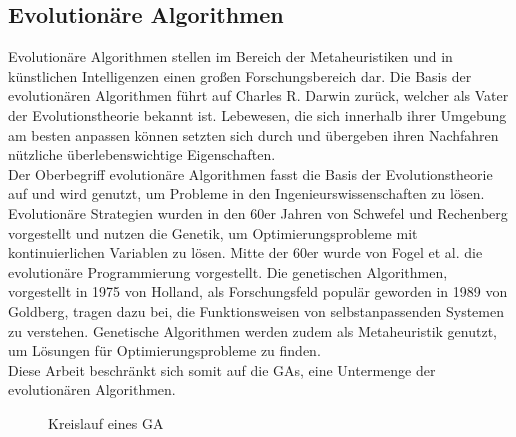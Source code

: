 \subsection{Evolutionäre Algorithmen} \label{subsec:Grundlagen_EvolutionäreAlgorithmen}

Evolutionäre Algorithmen stellen im Bereich der Metaheuristiken und in künstlichen Intelligenzen einen großen Forschungsbereich dar. Die Basis der evolutionären Algorithmen führt auf Charles R. Darwin zurück, welcher als Vater der Evolutionstheorie bekannt ist. Lebewesen, die sich innerhalb ihrer Umgebung am besten anpassen können setzten sich durch und übergeben ihren Nachfahren nützliche überlebenswichtige Eigenschaften. \cite[vgl.][S. 115]{siarry_metaheuristics_2016} \\

Der Oberbegriff \glqq evolutionäre Algorithmen\grqq{} fasst die Basis der Evolutionstheorie auf und wird genutzt, um Probleme in den Ingenieurswissenschaften zu lösen. Evolutionäre Strategien wurden in den 60er Jahren von Schwefel und Rechenberg vorgestellt und nutzen die Genetik, um Optimierungsprobleme mit kontinuierlichen Variablen zu lösen. Mitte der 60er wurde von Fogel et al. die evolutionäre Programmierung vorgestellt. Die genetischen Algorithmen, vorgestellt in 1975 von Holland, als Forschungsfeld populär geworden in 1989 von Goldberg, tragen dazu bei, die Funktionsweisen von selbstanpassenden Systemen zu verstehen. Genetische Algorithmen werden zudem als Metaheuristik genutzt, um Lösungen für Optimierungsprobleme zu finden. \cite[vgl.][S. 116]{siarry_metaheuristics_2016} \\
Diese Arbeit beschränkt sich somit auf die \acp{GA}, eine Untermenge der evolutionären Algorithmen. 

\begin{figure}[H]
    \centering
    \noindent{}
    \caption{Kreislauf eines \acf{GA}} 
    \label{img:ga_cirlce}
\end{figure}

